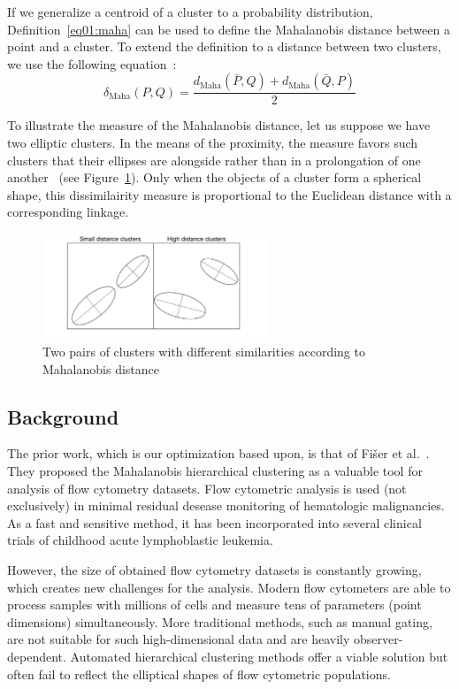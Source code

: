 If we generalize a centroid of a cluster to a probability distribution, Definition~\ref{eq01:maha} can be used to define the Mahalanobis distance between a point and a cluster. To extend the definition to a distance between two clusters, we use the following equation~\cite{fivser2012detection}:
\begin{equation}
    \delta_\text{Maha}(P,Q) = \frac{d_\text{Maha}(\bar{P},Q) + d_\text{Maha}(\bar{Q},P)}{2}
\end{equation}\label{eq01:maha_linkage}

To illustrate the measure of the Mahalanobis distance, let us suppose we have two elliptic clusters. In the means of the proximity, the measure favors such clusters that their ellipses are alongside rather than in a prolongation of one another~\cite{dagnelie1991using} (see Figure~\ref{fig:ellipses}). 
Only when the objects of a cluster form a spherical shape, this dissimilairity measure is proportional to the Euclidean distance with a corresponding linkage.

\begin{figure}[h]
    \centering
    \includegraphics[width=0.6\textwidth]{img/ellipses.pdf}
    \caption{Two pairs of clusters with different similarities according to Mahalanobis distance \cite{vsmelko2020gpu}}
    \label{fig:ellipses}
\end{figure}

\subsection{Background}

The prior work, which is our optimization based upon, is that of Fišer et al.~\cite{fivser2012detection}. They proposed the Mahalanobis hierarchical clustering as a valuable tool for analysis of flow cytometry datasets. Flow cytometric analysis is used (not exclusively) in minimal residual desease monitoring of hematologic malignancies. As a fast and sensitive method, it has been incorporated into several clinical trials of childhood acute lymphoblastic leukemia. 

However, the size of obtained flow cytometry datasets is constantly growing, which creates new challenges for the analysis. Modern flow cytometers are able to process samples with millions of cells and measure tens of parameters (point dimensions) simultaneously. More traditional methods, such as manual gating, are not suitable for such high-dimensional data and are heavily observer-dependent. Automated hierarchical clustering methods offer a viable solution but often fail to reflect the elliptical shapes of flow cytometric populations. 

